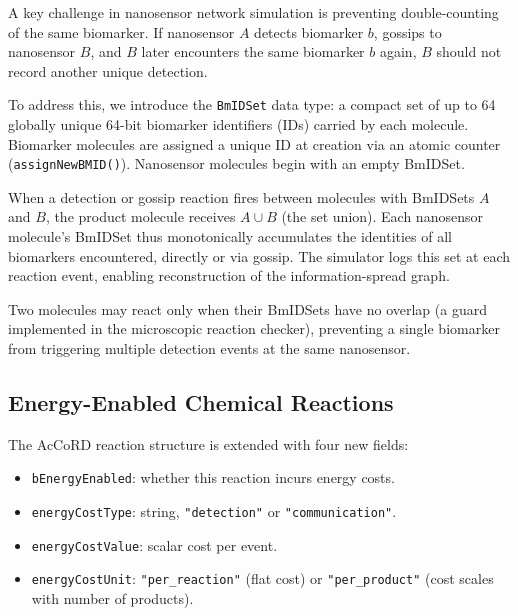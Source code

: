 \documentclass[journal]{IEEEtran}
\begin{document}
A key challenge in nanosensor network simulation is preventing double-counting
of the same biomarker. If nanosensor $A$ detects biomarker $b$, gossips to
nanosensor $B$, and $B$ later encounters the same biomarker $b$ again, $B$
should not record another unique detection.

To address this, we introduce the \texttt{BmIDSet} data type: a compact set
of up to 64 globally unique 64-bit biomarker identifiers (IDs) carried by each
molecule. Biomarker molecules are assigned a unique ID at creation via an
atomic counter (\texttt{assignNewBMID()}). Nanosensor molecules begin with an
empty BmIDSet.

When a detection or gossip reaction fires between molecules with BmIDSets $A$
and $B$, the product molecule receives $A \cup B$ (the set union). Each
nanosensor molecule's BmIDSet thus monotonically accumulates the identities of
all biomarkers encountered, directly or via gossip. The simulator logs this
set at each reaction event, enabling reconstruction of the information-spread
graph.

Two molecules may react only when their BmIDSets have no overlap (a guard
implemented in the microscopic reaction checker), preventing a single biomarker
from triggering multiple detection events at the same nanosensor.

\subsection{Energy-Enabled Chemical Reactions}

The AcCoRD reaction structure is extended with four new fields:
\begin{itemize}
  \item \texttt{bEnergyEnabled}: whether this reaction incurs energy costs.
  \item \texttt{energyCostType}: string, \texttt{"detection"} or
        \texttt{"communication"}.
  \item \texttt{energyCostValue}: scalar cost per event.
  \item \texttt{energyCostUnit}: \texttt{"per\_reaction"} (flat cost) or
        \texttt{"per\_product"} (cost scales with number of products).
\end{itemize}
\end{document}
